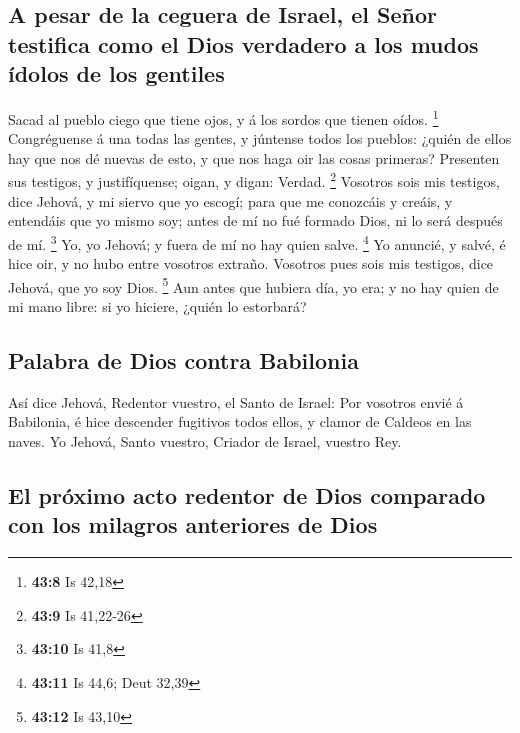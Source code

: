 \hypertarget{a-pesar-de-la-ceguera-de-israel-el-seuxf1or-testifica-como-el-dios-verdadero-a-los-mudos-uxeddolos-de-los-gentiles}{%
\subsection{A pesar de la ceguera de Israel, el Señor testifica como el
Dios verdadero a los mudos ídolos de los
gentiles}\label{a-pesar-de-la-ceguera-de-israel-el-seuxf1or-testifica-como-el-dios-verdadero-a-los-mudos-uxeddolos-de-los-gentiles}}

 Sacad al pueblo ciego que tiene ojos, y á los sordos que
tienen oídos. \footnote{\textbf{43:8} Is 42,18} 
Congréguense á una todas las gentes, y júntense todos los pueblos:
¿quién de ellos hay que nos dé nuevas de esto, y que nos haga oir las
cosas primeras? Presenten sus testigos, y justifíquense; oigan, y digan:
Verdad. \footnote{\textbf{43:9} Is 41,22-26}  Vosotros
sois mis testigos, dice Jehová, y mi siervo que yo escogí; para que me
conozcáis y creáis, y entendáis que yo mismo soy; antes de mí no fué
formado Dios, ni lo será después de mí. \footnote{\textbf{43:10} Is 41,8}
 Yo, yo Jehová; y fuera de mí no hay quien salve.
\footnote{\textbf{43:11} Is 44,6; Deut 32,39}  Yo
anuncié, y salvé, é hice oir, y no hubo entre vosotros extraño. Vosotros
pues sois mis testigos, dice Jehová, que yo soy Dios. \footnote{\textbf{43:12}
  Is 43,10}  Aun antes que hubiera día, yo era; y no hay
quien de mi mano libre: si yo hiciere, ¿quién lo estorbará?

\hypertarget{palabra-de-dios-contra-babilonia}{%
\subsection{Palabra de Dios contra
Babilonia}\label{palabra-de-dios-contra-babilonia}}

 Así dice Jehová, Redentor vuestro, el Santo de Israel:
Por vosotros envié á Babilonia, é hice descender fugitivos todos ellos,
y clamor de Caldeos en las naves.  Yo Jehová, Santo
vuestro, Criador de Israel, vuestro Rey.

\hypertarget{el-pruxf3ximo-acto-redentor-de-dios-comparado-con-los-milagros-anteriores-de-dios}{%
\subsection{El próximo acto redentor de Dios comparado con los milagros
anteriores de
Dios}\label{el-pruxf3ximo-acto-redentor-de-dios-comparado-con-los-milagros-anteriores-de-dios}}

